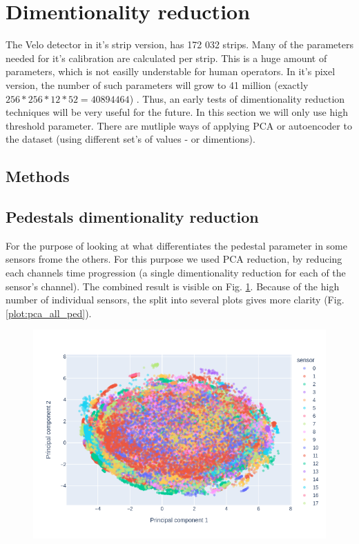 \section{Dimentionality reduction}
\label{chap4:dimred}

The Velo detector in it's strip version, has 172 032 strips. Many of the parameters needed for it's calibration are calculated per strip. This is a huge amount of parameters, which is not easilly understable for human operators.
In it's pixel version, the number of such parameters will grow to 41 million (exactly $256*256*12*52 = 40894464$) \cite{Collaboration:1624070}.
Thus, an early tests of dimentionality reduction techniques will be very useful for the future. In this section we will only use high threshold parameter.
There are mutliple ways of applying PCA or autoencoder to the dataset (using different set's of values - or dimentions).
\subsection{Methods}

\subsection{Pedestals dimentionality reduction}

For the purpose of looking at what differentiates the pedestal parameter in some sensors frome the others. For this purpose we used PCA reduction, by reducing each channels time progression (a single dimentionality reduction for each of the sensor's channel).
The combined result is visible on Fig. \ref{plot:pca_pedestals_all}. Because of the high number of individual sensors, the split into several plots gives more clarity (Fig. \ref{plot:pca_all_ped}).

\begin{figure}[H]
    \centering
    \includegraphics[width=0.7\linewidth]{figures/chapter4/dimred/PCA_pedestals_all.png}
    \caption{}
   \label{plot:pca_pedestals_all}
  \end{figure}

